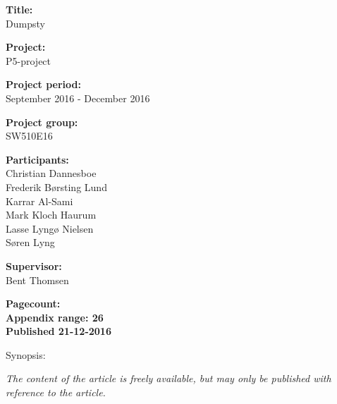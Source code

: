 \begin{minipage}[t]{0.48\textwidth}
\textbf{Title:} \\[5pt]\bigskip\hspace{2ex}
Dumpsty

\textbf{Project:} \\[5pt]\bigskip\hspace{2ex}
P5-project

\textbf{Project period:} \\[5pt]\bigskip\hspace{2ex}
September 2016 - December 2016

\textbf{Project group:} \\[5pt]\bigskip\hspace{2ex}
SW510E16	

\textbf{Participants:} \\[5pt]\hspace*{2ex}
Christian Dannesboe \\\hspace*{2ex}
Frederik Børsting Lund \\\hspace*{2ex}
Karrar Al-Sami \\\hspace*{2ex}
Mark Kloch Haurum \\\hspace*{2ex}
Lasse Lyngø Nielsen \\\hspace*{2ex}
Søren Lyng \\\hspace*{2ex}

\textbf{Supervisor:} \\[5pt]\hspace*{2ex}
Bent Thomsen

\vspace*{1cm}


\textbf{Pagecount: \pageref{LastPage}} \\
\textbf{Appendix range: 26} \\ 
\textbf{Published 21-12-2016}

\end{minipage}
\hfill
\begin{minipage}[t]{0.483\textwidth}
Synopsis: \\[5pt]
\fbox{\parbox{7cm}{\bigskip\bigskip}}
\end{minipage}

\vfill

{\footnotesize\itshape The content of the article is freely available, but may only be published with reference to the article.}

